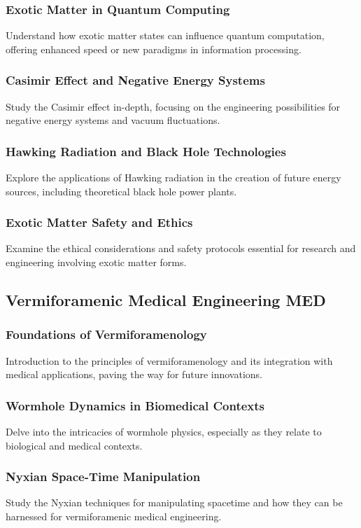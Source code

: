 \subsubsection{Exotic Matter in Quantum Computing}
Understand how exotic matter states can influence quantum computation, offering enhanced speed or new paradigms in information processing.
\subsubsection{Casimir Effect and Negative Energy Systems}
Study the Casimir effect in-depth, focusing on the engineering possibilities for negative energy systems and vacuum fluctuations.
\subsubsection{Hawking Radiation and Black Hole Technologies}
Explore the applications of Hawking radiation in the creation of future energy sources, including theoretical black hole power plants.
\subsubsection{Exotic Matter Safety and Ethics}
Examine the ethical considerations and safety protocols essential for research and engineering involving exotic matter forms.


\subsection{Vermiforamenic Medical Engineering \hfill MED}
\subsubsection{Foundations of Vermiforamenology}
Introduction to the principles of vermiforamenology and its integration with medical applications, paving the way for future innovations.
\subsubsection{Wormhole Dynamics in Biomedical Contexts}
Delve into the intricacies of wormhole physics, especially as they relate to biological and medical contexts.
\subsubsection{Nyxian Space-Time Manipulation}
Study the Nyxian techniques for manipulating spacetime and how they can be harnessed for vermiforamenic medical engineering.

